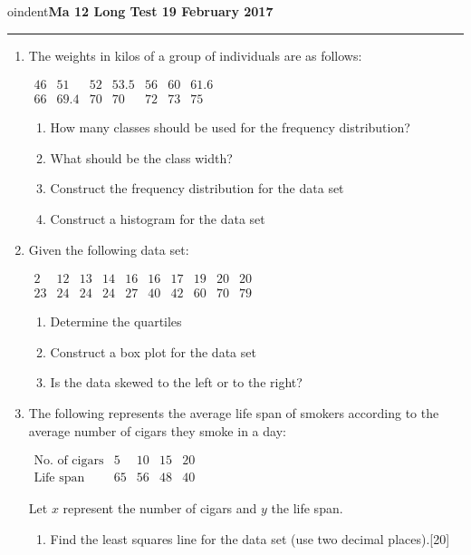 \documentclass[11pt]{article}
\begin{document}
\Large



oindent{\bf Ma 12 Long Test 1\hfill 9 February 2017}


\medskip\hrule
\begin{enumerate}

\item The weights in kilos of a group of individuals are as follows:
\begin{center}
$%
\begin{array}{ccccccc}
46 & 51 & 52 & 53.5 & 56 & 60 & 61.6  \\
66 & 69.4 & 70 & 70 & 72 & 73 & 75 %
\end{array}%
$
\end{center}
\begin{enumerate}
    \item How many classes should be used for the frequency distribution?
    \item What should be the class width?
    \item Construct the frequency distribution for the data set
    \item Construct a histogram for the data set
\end{enumerate}






\item Given the following data set:
 \begin{center}
$%
\begin{array}{cccccccccc}
2 & 12 & 13 & 14 & 16 & 16 & 17 & 19 & 20 & 20  \\
23 & 24 & 24 & 24 & 27 & 40 & 42 & 60 & 70 & 79 %
\end{array}%
$
\end{center}

\begin{enumerate}
    \item Determine the quartiles
    \item Construct a box plot for the data set
    \item Is the data skewed to the left or to the right?
\end{enumerate}

\item The following represents the average life span of  smokers according to the average number of cigars they smoke in a day:
\begin{center}
$%
\begin{array}{ccccc}
\text{No. of cigars} & 5 & 10 & 15 & 20
\\
\text{Life span} & 65 & 56 & 48 & 40 %
\end{array}%
$
\end{center}
Let $x$ represent the number of cigars and $y$ the life span.
\begin{enumerate}
\item Find the least squares line for the data set (use two decimal places).\hfill[20]


\end{enumerate}
\end{enumerate}
\end{document}

